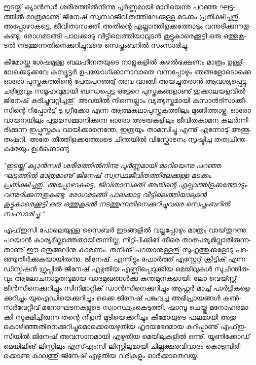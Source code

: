 ഇ­ട­യ്ക്കു് ക്യാന്‍­സര്‍ ശരീ­ര­ത്തില്‍­നി­ന്നു പൂര്‍­ണ്ണ­മാ­യി മാ­റി­യെ­ന്നു പറ­ഞ്ഞ ഘട്ട­ത്തില്‍ മാ­ത്ര­മാ­ണു് ജി­നേ­ഷ് 
സ്വ­സ്ഥ­ജീ­വി­ത­ത്തി­ലേ­ക്കു­ള്ള മട­ക്കം പ്ര­തീ­ക്ഷി­ച്ച­തു്. അപ്പോ­ഴാ­ക­ട്ടെ, ജീ­വി­താ­സ­ക്തി അതി­ന്റെ എല്ലാ­ത്തി­ള­ക്ക­ത്തോ­ടും 
വന്നു­ദി­ക്കു­ന്ന­തു­ക­ണ്ടു. രോ­ഗ­മ­ട­ങ്ങി പാ­ല­ക്കാ­ടു വീ­ട്ടി­ലെ­ത്തി­യാ­ലു­ടന്‍ കൂ­ട്ടു­കാ­രെ­ക്കൂ­ട്ടി ഒരു ഒത്തു­കൂ­ടല്‍ നട­ത്തു­ന്ന­തി­നെ­ക്കു­റി­ച്ചു­വ­രെ 
സെ­പ്തം­ബ­റില്‍ സം­സാ­രി­ച്ചു­.

­കീ­മോ­യ്ക്കു ശേ­ഷ­മു­ള്ള ബല­ഹീ­ന­ത­യു­ടെ നാ­ളു­ക­ളില്‍ കു­ഴല്‍­ഭ­ക്ഷ­ണം മാ­ത്രം ഉള്ളി­ലേ­ക്കെ­ടു­ക്ക­വേ കമ്പ്യൂ­ട്ടര്‍ ഉപ­യോ­ഗി­ക്കാ­നാ­വാ­തെ 
വന്ന­പ്പോ­ഴും ഞങ്ങ­ളോ­ടൊ­ക്കെ ഓരോ പു­സ്ത­ക­ത്തി­ന്റെ പേ­രു­പ­റ­ഞ്ഞു് അവ വാ­ങ്ങി അയ­ച്ചു­ത­രാന്‍ ആവ­ശ്യ­പ്പെ­ട്ടു. ചരി­ത്ര­വും 
സമൂ­ഹ­വു­മാ­യി ബന്ധ­പ്പെ­ട്ട ഒട്ടേ­റെ പു­സ്ത­ക­ങ്ങ­ളാ­ണു് ഇക്കാ­ല­യ­ള­വില്‍ ജി­നേ­ഷ് കു­ടി­ച്ചു­വ­റ്റി­ച്ച­തു്. അവ­യില്‍ നി­ന്നെ­ല്ലാം 
വ്യ­ത്യ­സ്ത­മാ­യി കസാന്‍­ദ്സാ­ക്കീ­സി­ന്റെ റി­പ്പോര്‍­ട്ട് ടു ഗ്രീ­ക്കോ എന്ന ആത്മ­ക­ഥാ­പു­സ്ത­ക­ത്തി­ലും മു­ങ്ങി­ത്താ­ഴ്ന്നു. ഓരോ വാ­യ­ന­യി­ലും 
പു­തു­മ­സ­മ്മാ­നി­ക്കു­ന്ന ഓരോ അട­രു­ക­ളി­ലും ജീ­വി­ത­കാ­മന കലര്‍­ന്നി­രി­ക്കു­ന്ന ഇപ്പു­സ്ത­കം വാ­യി­ക്കാ­നെ­ന്തേ, ഇത്ര­യും താ­മ­സി­ച്ചൂ 
എന്നു് എന്നോ­ടു് അത്ഭു­തം­കൂ­റി­.   അതേ തീ­ത്തി­ള­ക്ക­ത്തോ­ടെ ചി­ന്ത­യില്‍ വി­സ്ഫോ­ട­നം സൃ­ഷ്ടി­ച്ച തത്വ­ചി­ന്ത­ക­രേ­യും ഉള്‍­ക്കൊ­ണ്ടു­.

\emph{"ഇടയ്ക്കു് ക്യാന്‍സര്‍ ശരീരത്തില്‍നിന്നു പൂര്‍ണ്ണമായി മാറിയെന്നു പറഞ്ഞ ഘട്ടത്തില്‍ മാത്രമാണു് ജിനേഷ് 
സ്വസ്ഥജീവിതത്തിലേക്കുള്ള മടക്കം പ്രതീക്ഷിച്ചതു്. അപ്പോഴാകട്ടെ, ജീവിതാസക്തി അതിന്റെ എല്ലാത്തിളക്കത്തോടും 
വന്നുദിക്കുന്നതുകണ്ടു. രോഗമടങ്ങി പാലക്കാടു വീട്ടിലെത്തിയാലുടന്‍ കൂട്ടുകാരെക്കൂട്ടി ഒരു ഒത്തുകൂടല്‍ നടത്തുന്നതിനെക്കുറിച്ചുവരെ
 സെപ്തംബറില്‍ സംസാരിച്ചു."}

എഫ്ഇ­സി പോ­ലെ­യു­ള്ള സൈ­ബര്‍ ഇട­ങ്ങ­ളില്‍ വല്ല­പ്പോ­ഴും മാ­ത്രം വാ­യ്‌­തു­റ­ന്നു. പറ­യാന്‍ കാ­ര്യ­മി­ല്ലാ­ത്ത­താ­യി­രു­ന്നി­ല്ല, 
നി­റ്റ്പി­ക്കി­ങ് തീ­രെ താ­ത്പ­ര്യ­മി­ല്ലാ­തി­രു­ന്ന­താ­ണു് ഈ ഒതു­ങ്ങ­ലി­നു കാ­ര­ണം. തനി­ക്കു് പറ­യാ­നു­ള്ള­തു് സു­ഹൃ­ത്തു­ക്ക­ളോ­ടു 
പറ­ഞ്ഞു­തീര്‍­ക്കു­ക­യാ­യി­രു­ന്നു, ജി­നേ­ഷ്. എന്നി­ട്ടും ഫോര്‍­ത്ത് എസ്റ്റേ­റ്റ് ക്രി­ട്ടി­ക്‍ എന്ന ഡി­സ്ക­ഷന്‍ ഗ്രൂ­പ്പില്‍ ജി­നേ­ഷ് എഴു­തിയ 
എണ്ണി­പ്പെ­റു­ക്കിയ മെ­യി­ലു­കള്‍ സു­ചി­ന്തി­ത­വും ആലോ­ച­നാ­മൃ­ത­വു­മായ വാ­ദ­മു­ഖ­ങ്ങള്‍­ക്കു കു­ന്ത­മു­ന­ക­ളാ­യി. ലോ വെ­യ്സ്റ്റ് 
ജീന്‍­സി­നെ­ക്കു­റി­ച്ചും സി­നി­മാ­റ്റി­ക്‍ ഡാന്‍­സി­നെ­ക്കു­റി­ച്ചും ആഫ്റ്റര്‍ മാ­ച്ച് പാര്‍­ട്ടി­ക­ളെ­ക്കു­റി­ച്ചും യു­ഐ­ഡി­യെ­ക്കു­റി­ച്ചും ഒക്കെ 
ജി­നേ­ഷ് പങ്കു­വ­ച്ച അഭി­പ്രാ­യ­ങ്ങള്‍ കണ്‍­സര്‍­വേ­റ്റീ­വ് മനോ­ഘ­ട­ന­ക­ളു­ടെ സ്വാ­സ്ഥ്യം­കെ­ടു­ത്തി. ഷാ­മ്പൂ ചെ­യ്തു മനോ­ഹ­ര­മാ­ക്കി 
സൂ­ക്ഷി­ച്ചി­രു­ന്ന തന്റെ നീ­ളന്‍ മു­ടി­യെ­ക്കു­റി­ച്ചും കീ­മോ­യു­ടെ ഫല­മാ­യി അതു­കൊ­ഴി­ഞ്ഞ­തി­നെ­ക്കു­റി­ച്ചു­മൊ­ക്കെ­യെ­ഴു­തിയ 
ഹൃ­ദ­യ­ഭേ­ദ­മായ കു­റി­പ്പാ­ണു് എഫ്ഇ­സി­യില്‍ ജി­നേ­ഷ് അവ­സാ­ന­മാ­യി എഴു­തിയ മെ­യി­ലു­ക­ളില്‍ ഒന്നു്. യൂ­ണി­ക്കോ­ഡ് 
മെ­യി­ലി­ങ് ലി­സ്റ്റി­ലും എസ്എം­സി ലി­സ്റ്റി­ലു­മാ­യി ചി­ല്ല­ക്ഷ­ര­വി­വാ­ദം കൊ­ടു­മ്പി­രി­ക്കൊ­ണ്ട കാ­ല­ത്തു് ജി­നേ­ഷ് എഴു­തിയ വരി­ക­ളും 
ഓര്‍­ക്കാ­തെ­വ­യ്യ.

